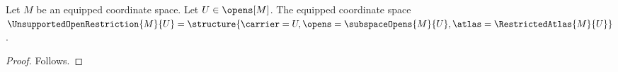 

\begin{construction}\label{unsupported_open_restriction}
    Let $M$ be an equipped coordinate space.
    Let $U\in\opens[M]$.
    The equipped coordinate space $\UnsupportedOpenRestriction{M}{U}=
        \structure{\carrier=U,\opens=\subspaceOpens{M}{U},
            \atlas=\RestrictedAtlas{M}{U}}$.
\end{construction}
\begin{proof}
    Follows.
\end{proof}
